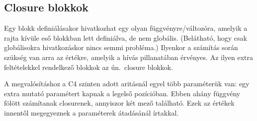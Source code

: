 \documentclass[magyar,12pt,a4paper,final,titlepage]{report}
\def\un{ún.\ }
\begin{document}
    \subsection{Closure blokkok}

    Egy blokk definiálásakor hivatkozhat egy olyan függvényre/változóra, amelyik a rajta kívüle eső blokkban lett definiálva, de nem globális.
    (Belátható, hogy csak globálisokra hivatkozáskor nincs semmi probléma.)
    Ilyenkor a számítás során szükség van arra az értékre, amelyik a hívás pillanatában érvényes.
    Az ilyen extra feltételekkel rendelkező blokkok az \un \gls{closure} blokkok.

    A megvalósításhoz a C4 szinten adott aritásnál egyel több paraméterük van: egy extra mutató paramétert kapnak a legelső pozícióban.
    Ebben ahány függvény fölött számítanak \gls{closure}nek, annyiszor két mező található.
    Ezek az értékek innentől megegyeznek a paraméterek átadásánál írtakkal.


    \printglossary[type=\acronymtype,title=Rövidítésjegyzék]

    \printglossary

    
\end{document}
